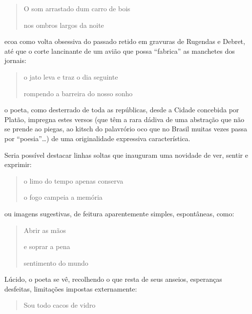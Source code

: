 \documentclass[
  letterpaper,
  DIV=11,
  numbers=noendperiod]{scrreprt}
\begin{document}
\begin{quote}
O som arrastado dum carro de bois

nos ombros largos da noite
\end{quote}

ecoa como volta obsessiva do passado retido em gravuras de Rugendas e
Debret, até que o corte lancinante de um avião que possa ``fabrica'' as
manchetes dos jornais:

\begin{quote}
o jato leva e traz o dia seguinte

rompendo a barreira do nosso sonho
\end{quote}

o poeta, como desterrado de toda as repúblicas, desde a Cidade concebida
por Platão, impregna estes versos (que têm a rara dádiva de uma
abstração que não se prende ao piegas, ao kitsch do palavrório oco que
no Brasil muitas vezes passa por ``poesia''\ldots) de uma originalidade
expressiva característica.

Seria possível destacar linhas soltas que inauguram uma novidade de ver,
sentir e exprimir:

\begin{quote}
o limo do tempo apenas conserva

o fogo campeia a memória
\end{quote}

ou imagens sugestivas, de feitura aparentemente simples, espontâneas,
como:

\begin{quote}
Abrir as mãos

e soprar a pena

sentimento do mundo
\end{quote}

Lúcido, o poeta se vê, recolhendo o que resta de seus anseios,
esperanças desfeitas, limitações impostas externamente:

\begin{quote}
Sou todo cacos de vidro
\end{quote}
\end{document}

